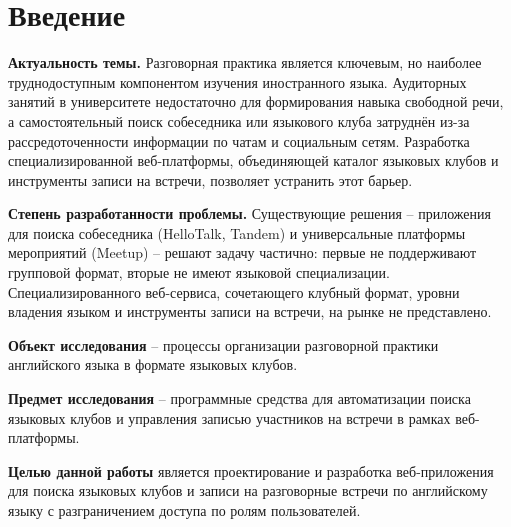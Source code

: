 \section*{Введение}

\textbf{Актуальность темы.} Разговорная практика является ключевым, но наиболее
труднодоступным компонентом изучения иностранного языка. Аудиторных занятий в
университете недостаточно для формирования навыка свободной речи, а самостоятельный
поиск собеседника или языкового клуба затруднён из-за рассредоточенности информации
по чатам и социальным сетям. Разработка специализированной веб-платформы,
объединяющей каталог языковых клубов и инструменты записи на встречи, позволяет
устранить этот барьер.

\textbf{Степень разработанности проблемы.} Существующие решения -- приложения для
поиска собеседника (HelloTalk, Tandem) и универсальные платформы мероприятий
(Meetup) -- решают задачу частично: первые не поддерживают групповой формат, вторые
не имеют языковой специализации. Специализированного веб-сервиса, сочетающего
клубный формат, уровни владения языком и инструменты записи на встречи, на рынке
не представлено.

\textbf{Объект исследования} -- процессы организации разговорной практики
английского языка в формате языковых клубов.

\textbf{Предмет исследования} -- программные средства для автоматизации поиска
языковых клубов и управления записью участников на встречи в рамках веб-платформы.

\textbf{Целью данной работы} является проектирование и разработка веб-приложения
для поиска языковых клубов и записи на разговорные встречи по английскому языку
с разграничением доступа по ролям пользователей.
